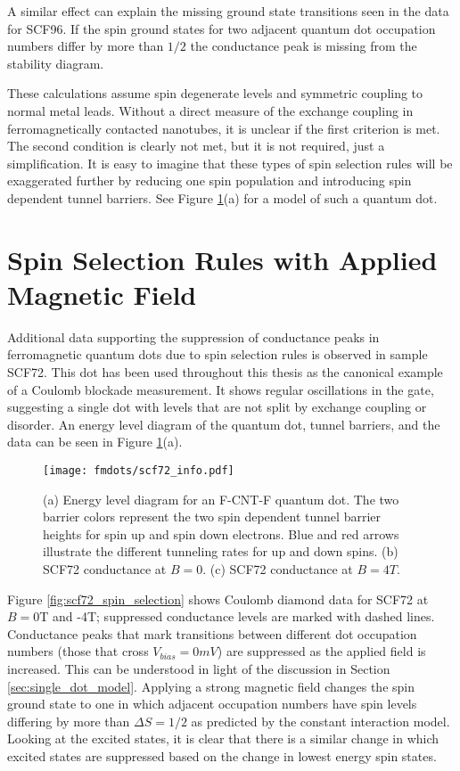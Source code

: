 A similar effect can explain the missing ground state transitions seen in the data for SCF96. If the spin ground states for two adjacent quantum dot occupation numbers differ by more than $1/2$ the conductance peak is missing from the stability diagram.

These calculations assume spin degenerate levels and symmetric coupling to normal metal leads. Without a direct measure of the exchange coupling in ferromagnetically contacted nanotubes, it is unclear if the first criterion is met. The second condition is clearly not met, but it is not required, just a simplification. It is easy to imagine that these types of spin selection rules will be exaggerated further by reducing one spin population and introducing spin dependent tunnel barriers. See Figure \ref{fig:scf72_info}(a) for a model of such a quantum dot.

\section{Spin Selection Rules with Applied Magnetic Field}
\label{sec:spin_selection_field}

Additional data supporting the suppression of conductance peaks in ferromagnetic quantum dots due to spin selection rules is observed in sample SCF72. This dot has been used throughout this thesis as the canonical example of a Coulomb blockade measurement. It shows regular oscillations in the gate, suggesting a single dot with levels that are not split by exchange coupling or disorder. An energy level diagram of the quantum dot, tunnel barriers, and the data can be seen in Figure \ref{fig:scf72_info}(a). 

\begin{figure}
    \centering
    \texttt{[image: fmdots/scf72\_info.pdf]}
    \caption{(a) Energy level diagram for an F-CNT-F quantum dot. The two barrier colors represent the two spin dependent tunnel barrier heights for spin up and spin down electrons. Blue and red arrows illustrate the different tunneling rates for up and down spins. (b) SCF72 conductance at $B=0$. (c) SCF72 conductance at $B=4T$.}
    \label{fig:scf72_info}
\end{figure}

Figure \ref{fig:scf72_spin_selection} shows Coulomb diamond data for SCF72 at $B=0$T and -4T; suppressed conductance levels are marked with dashed lines. Conductance peaks that mark transitions between different dot occupation numbers (those that cross $V_{bias}=0mV$) are suppressed as the applied field is increased. This can be understood in light of the discussion in Section \ref{sec:single_dot_model}. Applying a strong magnetic field changes the spin ground state to one in which adjacent occupation numbers have spin levels differing by more than $\Delta S = 1/2$ as predicted by the constant interaction model. Looking at the excited states, it is clear that there is a similar change in which excited states are suppressed based on the change in lowest energy spin states.

